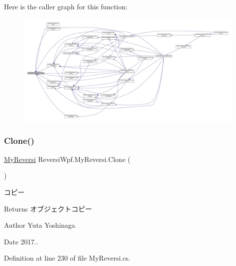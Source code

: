 Here is the caller graph for this function\+:
\nopagebreak
\begin{figure}[H]
\begin{center}
\leavevmode
\includegraphics[width=350pt]{class_reversi_wpf_1_1_my_reversi_adc98d24744c8e50f62f94b9441f582c5_icgraph}
\end{center}
\end{figure}
\mbox{\label{class_reversi_wpf_1_1_my_reversi_aff9b97e9e4102966ea558428255974e2}} 
\subsubsection{\texorpdfstring{Clone()}{Clone()}}
{\footnotesize\ttfamily \hyperlink{class_reversi_wpf_1_1_my_reversi}{My\+Reversi} Reversi\+Wpf.\+My\+Reversi.\+Clone (\begin{DoxyParamCaption}{ }\end{DoxyParamCaption})}



コピー 

\begin{DoxyReturn}{Returns}
オブジェクトコピー 
\end{DoxyReturn}
\begin{DoxyAuthor}{Author}
Yuta Yoshinaga 
\end{DoxyAuthor}
\begin{DoxyDate}{Date}
2017.. 
\end{DoxyDate}


Definition at line 230 of file My\+Reversi.\+cs.

\mbox{\label{class_reversi_wpf_1_1_my_reversi_a57482d7118dad2c5d104e186acd5212b}} 
